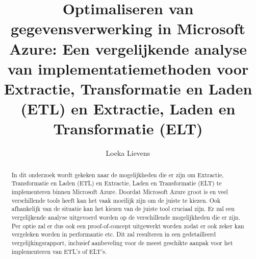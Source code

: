 \documentclass{hogent-article}
\title{Optimaliseren van gegevensverwerking in Microsoft Azure: Een vergelijkende analyse van implementatiemethoden voor Extractie, Transformatie en Laden (ETL) en Extractie, Laden en Transformatie (ELT)}
\author{Loeka Lievens}
\begin{document}
\begin{abstract}
  In dit onderzoek wordt gekeken naar de mogelijkheden die er zijn om Extractie, Transformatie en Laden (ETL) en Extractie, Laden en Transformatie (ELT) te implementeren binnen Microsoft Azure. Doordat Microsoft Azure groot is en veel verschillende tools heeft kan het vaak moeilijk zijn om de juiste te kiezen. Ook afhankelijk van de situatie kan het kiezen van de juiste tool cruciaal zijn. Er zal een vergelijkende analyse uitgevoerd worden op de verschillende mogelijkheden die er zijn. Per optie zal er dus ook een proof-of-concept uitgewerkt worden zodat er ook zeker kan vergeleken worden in performantie etc. Dit zal resulteren in een gedetailleerd vergelijkingsrapport, inclusief aanbeveling voor de meest geschikte aanpak voor het implementeren van ETL's of ELT's.
\end{abstract}

\tableofcontents



\printbibliography[heading=bibintoc]
\end{document}
